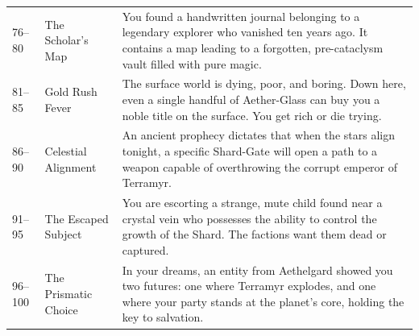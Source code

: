 \begin{longtable}{lp{4cm}p{9.5cm}}
\midrule
\rowcolor{white}\multicolumn{3}{l}{\textbf{Category 4: Mysteries, Prophecies \& Greed}} \\
\midrule
76–80 & The Scholar's Map & You found a handwritten journal belonging to a legendary explorer who vanished ten years ago. It contains a map leading to a forgotten, pre-cataclysm vault filled with pure magic. \\
81–85 & Gold Rush Fever & The surface world is dying, poor, and boring. Down here, even a single handful of Aether-Glass can buy you a noble title on the surface. You get rich or die trying. \\
86–90 & Celestial Alignment & An ancient prophecy dictates that when the stars align tonight, a specific Shard-Gate will open a path to a weapon capable of overthrowing the corrupt emperor of Terramyr. \\
91–95 & The Escaped Subject & You are escorting a strange, mute child found near a crystal vein who possesses the ability to control the growth of the Shard. The factions want them dead or captured. \\
96–100 & The Prismatic Choice & In your dreams, an entity from Aethelgard showed you two futures: one where Terramyr explodes, and one where your party stands at the planet's core, holding the key to salvation. \\
\end{longtable}
\twocolumn